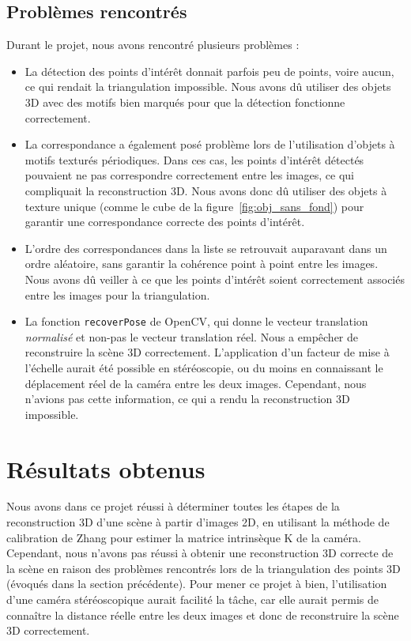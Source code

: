 \documentclass[12pt]{article}
\begin{document}
\subsection{Problèmes rencontrés}

Durant le projet, nous avons rencontré plusieurs problèmes :
\begin{itemize}
    \item La détection des points d'intérêt donnait parfois peu de points, voire aucun, ce qui rendait la triangulation impossible. Nous avons dû utiliser des objets 3D avec des motifs bien marqués pour que la détection fonctionne correctement.
    \item La correspondance a également posé problème lors de l'utilisation d'objets à motifs texturés périodiques. Dans ces cas, les points d'intérêt détectés pouvaient ne pas correspondre correctement entre les images, ce qui compliquait la reconstruction 3D. Nous avons donc dû utiliser des objets à texture unique (comme le cube de la figure~\ref{fig:obj_sans_fond}) pour garantir une correspondance correcte des points d'intérêt.
    \item L'ordre des correspondances dans la liste se retrouvait auparavant dans un ordre aléatoire, sans garantir la cohérence point à point entre les images. Nous avons dû veiller à ce que les points d'intérêt soient correctement associés entre les images pour la triangulation.
    \item La fonction \texttt{recoverPose} de OpenCV, qui donne le vecteur translation \textit{normalisé} et non-pas le vecteur translation réel. Nous a empêcher de reconstruire la scène 3D correctement. L'application d'un facteur de mise à l'échelle aurait été possible en stéréoscopie, ou du moins en connaissant le déplacement réel de la caméra entre les deux images. Cependant, nous n'avions pas cette information, ce qui a rendu la reconstruction 3D impossible.
\end{itemize}

\newpage
\section{Résultats obtenus}

Nous avons dans ce projet réussi à déterminer toutes les étapes de la reconstruction 3D d'une scène à partir d'images 2D, en utilisant la méthode de calibration de Zhang pour estimer la matrice intrinsèque K de la caméra.
Cependant, nous n'avons pas réussi à obtenir une reconstruction 3D correcte de la scène en raison des problèmes rencontrés lors de la triangulation des points 3D (évoqués dans la section précédente). Pour mener ce projet à bien, l'utilisation d'une caméra stéréoscopique aurait facilité la tâche, car elle aurait permis de connaître la distance réelle entre les deux images et donc de reconstruire la scène 3D correctement.
\end{document}
